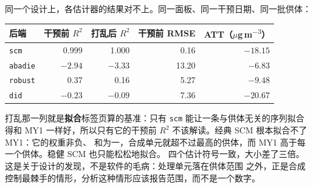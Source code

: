\documentclass[11pt]{ctexrep}
\newcommand{\codeunderscore}{\textunderscore\allowbreak}
\newcommand{\code}[1]{\texttt{\let\_\codeunderscore #1}}
\newcommand{\tab}[1]{\textbf{#1}}
\newcommand{\ugm}{\ensuremath{\mu}g\,m\textsuperscript{$-3$}}
\begin{document}
同一个设计上，各估计器的结果对不上。同一面板、同一干预日期、同一批供体：
\begin{center}\small
\begin{tabular}{@{}lrrrr@{}}
\toprule
后端 & 干预前 $R^2$ & 打乱后 $R^2$ & 干预前 RMSE & ATT（\ugm{}） \\
\midrule
\code{scm}    & 0.999  & 1.000   & 0.16  & $-18.15$ \\
\code{abadie} & $-2.94$ & $-3.33$ & 13.20 & $-6.83$ \\
\code{robust} & 0.37   & 0.16    & 5.27  & $-9.48$ \\
\code{did}    & $-0.23$ & $-0.09$ & 7.36  & $-20.67$ \\
\bottomrule
\end{tabular}
\end{center}
打乱那一列就是\tab{拟合}标签页算的基准：只有 \code{scm} 能让一条与供体无关的序列拟合得和
MY1 一样好，所以只有它的干预前 $R^2$ 不该解读。经典 SCM 根本拟合不了 MY1：它的权重非负、
和为一，合成单元就超不过最高的供体，而 MY1 高于每一个供体。稳健 SCM 也只能松松地拟合。
四个估计符号一致，大小差了三倍。这是关于设计的发现，不是软件的毛病：处理单元落在供体范围
之外，正是合成控制最棘手的情形，分析这种情形应该报告范围，而不是一个数字。
\end{document}
